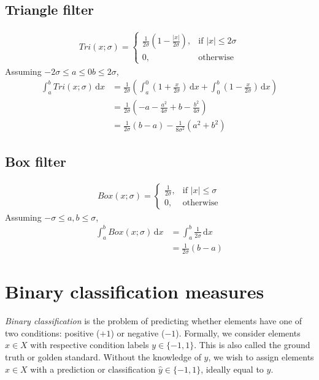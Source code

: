 \documentclass[thesis.tex]{subfiles}
\begin{document}
\subsection{Triangle filter}
\label{sec:histogramsTriangleFilter}
%
\begin{align*}
\mathit{Tri} (x; \sigma) = 
\begin{cases}
    \frac{1}{2 \sigma} \left( 1 - \frac{| x |}{2 \sigma} \right) ,& \text{if } |x| \leq 2 \sigma \\
    0,              & \text{otherwise}
\end{cases}
\end{align*}
%
Assuming $-2 \sigma \leq a \leq 0 b \leq 2 \sigma$,
%
\begin{align*}
\int_a^b \mathit{Tri} (x; \sigma) \,\mathrm dx &= \frac{1}{2 \sigma} \left( \int_a^0 \left( 1 + \frac{x}{2 \sigma} \right) \,\mathrm dx + \int_0^b \left( 1 - \frac{x}{2 \sigma} \right) \,\mathrm dx \right) \\
&= \frac{1}{2 \sigma} \left( - a - \frac{a^2}{4 \sigma} + b - \frac{b^2}{4 \sigma} \right) \\
&= \frac{1}{2 \sigma} (b - a) - \frac{1}{8 \sigma^2} (a^2 + b^2)
\end{align*}
%
\subsection{Box filter}
\label{sec:histogramsBoxFilter}
%
\begin{align*}
\mathit{Box} (x; \sigma) = 
\begin{cases}
    \frac{1}{2 \sigma},& \text{if } |x| \leq \sigma \\
    0,              & \text{otherwise}
\end{cases}
\end{align*}
%
Assuming $-\sigma \leq a,b \leq \sigma$,
%
\begin{align*}
\int_a^b \mathit{Box} (x; \sigma) \,\mathrm dx &= \int_a^b \frac{1}{2 \sigma} \,\mathrm dx \\
&= \frac{1}{2 \sigma} (b - a)
\end{align*}
%
\section{Binary classification measures}
%
\emph{Binary classification} is the problem of predicting whether elements have one of two conditions: positive ($+1$) or negative ($-1$). Formally, we consider elements $x \in X$ with respective condition labels $y \in \{-1, 1\}$. This is also called the ground truth or golden standard. Without the knowledge of $y$, we wish to assign elements $x \in X$ with a prediction or classification $\hat{y} \in \{-1, 1\}$, ideally equal to $y$.
\end{document}

